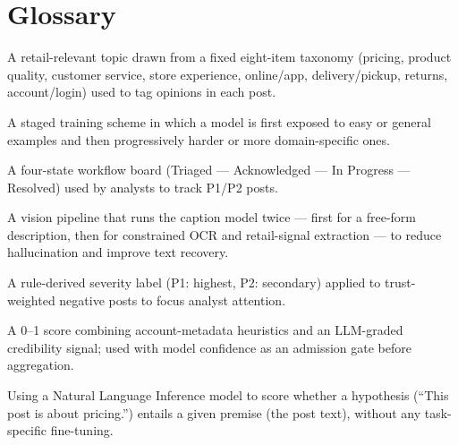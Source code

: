 \chapter*{Glossary}

\begin{description}\setlength{\itemsep}{4pt}
\item[Aspect] A retail-relevant topic drawn from a fixed eight-item taxonomy
      (pricing, product quality, customer service, store experience,
      online/app, delivery/pickup, returns, account/login) used to tag
      opinions in each post.
\item[Curriculum learning] A staged training scheme in which a model is first
      exposed to easy or general examples and then progressively harder or
      more domain-specific ones.
\item[Kanban lifecycle] A four-state workflow board (Triaged --- Acknowledged
      --- In Progress --- Resolved) used by analysts to track P1/P2 posts.
\item[Multi-pass captioning] A vision pipeline that runs the caption model
      twice --- first for a free-form description, then for constrained OCR
      and retail-signal extraction --- to reduce hallucination and improve
      text recovery.
\item[Priority tier] A rule-derived severity label (P1: highest, P2:
      secondary) applied to trust-weighted negative posts to focus analyst
      attention.
\item[Trust score] A 0--1 score combining account-metadata heuristics and an
      LLM-graded credibility signal; used with model confidence as an
      admission gate before aggregation.
\item[Zero-shot NLI] Using a Natural Language Inference model to score
      whether a hypothesis (``This post is about pricing.'') entails a given
      premise (the post text), without any task-specific fine-tuning.
\end{description}
\cleardoublepage
